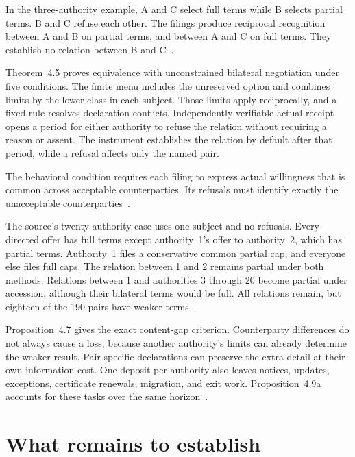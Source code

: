 \documentclass{momentum}
\begin{document}
In the three-authority example, A and C select full terms while B selects partial terms.
B and C refuse each other.
The filings produce reciprocal recognition between A and B on partial terms, and between A and C on full terms.
They establish no relation between B and C~\cite[Section~2.2]{accession}.

Theorem~4.5 proves equivalence with unconstrained bilateral negotiation under five conditions.
The finite menu includes the unreserved option and combines limits by the lower class in each subject.
Those limits apply reciprocally, and a fixed rule resolves declaration conflicts.
Independently verifiable actual receipt opens a period for either authority to refuse the relation without requiring a reason or assent.
The instrument establishes the relation by default after that period, while a refusal affects only the named pair.

The behavioral condition requires each filing to express actual willingness that is common across acceptable counterparties.
Its refusals must identify exactly the unacceptable counterparties~\cite[Sections~4.1--4.2]{accession}.

The source's twenty-authority case uses one subject and no refusals.
Every directed offer has full terms except authority~1's offer to authority~2, which has partial terms.
Authority~1 files a conservative common partial cap, and everyone else files full caps.
The relation between 1 and 2 remains partial under both methods.
Relations between 1 and authorities 3 through 20 become partial under accession, although their bilateral terms would be full.
All relations remain, but eighteen of the 190 pairs have weaker terms~\cite[Section~4.6, ``A useful profile beyond (H5)'']{accession}.

Proposition~4.7 gives the exact content-gap criterion.
Counterparty differences do not always cause a loss, because another authority's limits can already determine the weaker result.
Pair-specific declarations can preserve the extra detail at their own information cost.
One deposit per authority also leaves notices, updates, exceptions, certificate renewals, migration, and exit work.
Proposition~4.9a accounts for these tasks over the same horizon~\cite[Sections~4.3--4.5]{accession}.

\section{What remains to establish}
\label{sec:limits}
\end{document}
